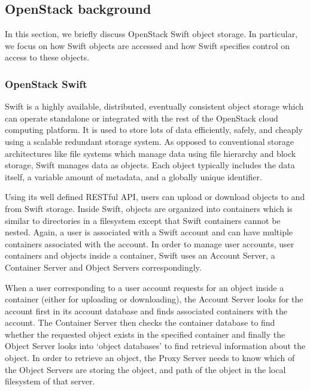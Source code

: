 \subsection{OpenStack background}
In this section, we briefly discuss OpenStack Swift object storage. In particular, we focus on how Swift objects are accessed and how Swift specifies control on access to these objects.
\subsubsection{OpenStack Swift}

Swift is a highly available, distributed, eventually consistent object storage which can operate standalone or integrated with the rest of the OpenStack cloud computing platform. It is used  to store lots of data efficiently, safely, and cheaply using a scalable redundant storage system. As opposed to conventional storage architectures like file systems which manage data using file hierarchy and block storage, Swift manages data as objects. Each object typically includes the data itself, a variable amount of metadata, and a globally unique identifier.

Using its well defined RESTful API, users can upload or download objects to and from Swift storage. Inside Swift, objects are organized into containers which is similar to directories in a filesystem except that Swift containers cannot be nested. Again, a user is associated with a Swift account and can have multiple containers associated with the account. In order to manage user accounts, user containers and objects inside a container, Swift uses an Account Server, a Container Server and Object Servers correspondingly.

When a user corresponding to a user account requests for an object inside a container (either for uploading or downloading), the Account Server looks for the account first in its account database and finds associated containers with the account. The Container Server then checks the container database to find whether the requested object exists in the specified container and finally the Object Server looks into `object databases' to find retrieval information about the object. In order to retrieve an object, the Proxy Server needs to know which of the Object Servers are storing the object, and path of the object in the local filesystem of that server.





